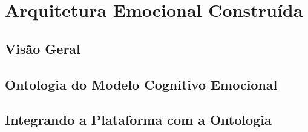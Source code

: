 \chapter{Arquitetura Emocional Constru\'ida} \label{ch:aec}


\section{Visão Geral}
\section{Ontologia do Modelo Cognitivo Emocional} %
\section{Integrando a Plataforma \jason com a Ontologia}
